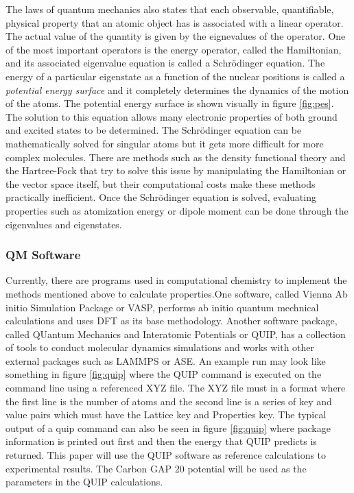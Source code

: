 \documentclass[12pt, abstract = true]{scrartcl}
\begin{document}
The laws of quantum mechanics also states that each observable, quantifiable, physical property that 
an atomic object has is associated with a linear operator. The actual value of the quantity is given 
by the eignevalues of the operator. One of the most important operators is the energy operator, called 
the Hamiltonian, and its associated eigenvalue equation is called a Schrödinger equation. The energy of 
a particular eigenstate as a function of the nuclear positions is called a \emph{potential energy surface}
and it completely determines the dynamics of the motion of the atoms. The potential energy surface is shown visually in figure \ref{fig:pes}. The solution to this equation 
allows many electronic properties of both ground and excited states to be determined. The Schrödinger 
equation can be mathematically solved for singular atoms but it gets more difficult for more complex molecules. 
There are methods such as the density functional theory and the Hartree-Fock that try to 
solve this issue by manipulating the Hamiltonian or the vector space itself, but their computational 
costs make these methods practically inefficient. Once the Schrödinger equation is solved, evaluating 
properties such as atomization energy or dipole moment can be done through the eigenvalues and eigenstates.

\subsubsection{QM Software} 

Currently, there are programs used in computational chemistry to implement the methods mentioned above to 
calculate properties.One software, called Vienna Ab initio Simulation Package or VASP, performs ab initio 
quantum mechnical calculations and uses DFT as its base methodology. Another software package, called 
QUantum Mechanics and Interatomic Potentials or QUIP\cite{quip}, has a collection of tools to conduct 
molecular dynamics simulations and works with other external packages such as LAMMPS or ASE. An example run may look like something in figure \ref{fig:quip} where the QUIP command is executed on the command line using a referenced XYZ file. The XYZ file must in a format where the first line is the number of atoms and the second line is a series of key and value pairs which must have the Lattice key and Properties key. The typical output of a quip command can also be seen in figure \ref{fig:quip} where package information is printed out first and then the energy that QUIP predicts is returned. This paper 
will use the QUIP software as reference calculations to experimental results. The Carbon GAP 20 
potential\cite{gap20} will be used as the parameters in the QUIP calculations.
\end{document}
